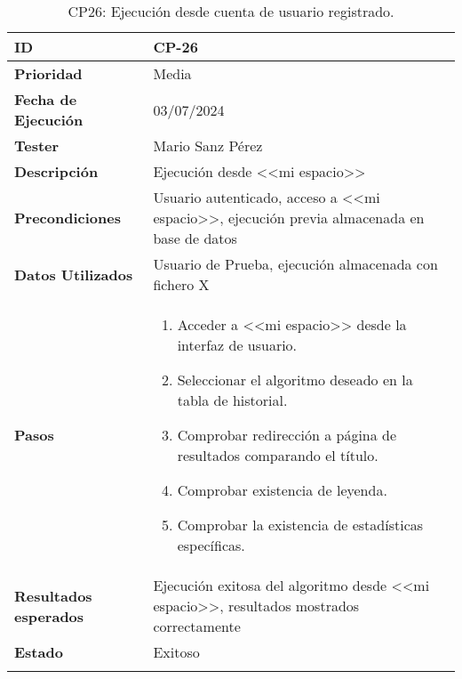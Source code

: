 \begin{longtable}{>{\raggedright\arraybackslash}p{4cm} p{9.5cm}}
    \hline
    \rowcolor{gray!20}
    \textbf{ID} & CP-26\\
    \hline
    \rowcolor{white}
    \textbf{Prioridad} & Media \\
    \hline
    \rowcolor{gray!20}
    \textbf{Fecha de Ejecución} & 03/07/2024 \\
    \hline
    \rowcolor{white}
    \textbf{Tester} & Mario Sanz Pérez \\
    \hline
    \rowcolor{gray!20}
    \textbf{Descripción} & Ejecución desde <<mi espacio>>\\
    \hline
    \rowcolor{white}
    \textbf{Precondiciones} & Usuario autenticado, acceso a <<mi espacio>>, ejecución previa almacenada en base de datos\\
    \hline
    \rowcolor{white}
    \textbf{Datos Utilizados} & Usuario de Prueba, ejecución almacenada con fichero X\\
    \hline
    \rowcolor{gray!20}
    \textbf{Pasos} & \begin{enumerate}
        \item Acceder a <<mi espacio>> desde la interfaz de usuario.
        \item Seleccionar el algoritmo deseado en la tabla de historial.
        \item Comprobar redirección a página de resultados comparando el título.
        \item Comprobar existencia de leyenda.
        \item Comprobar la existencia de estadísticas específicas.
    \end{enumerate}\\
	\hline
    \rowcolor{gray!20}
    \textbf{Resultados esperados} & Ejecución exitosa del algoritmo desde <<mi espacio>>, resultados mostrados correctamente\\
    \hline
    \rowcolor{white}
    \textbf{Estado} & Exitoso\\
    \hline
	\caption[CP26: Ejecución desde cuenta de usuario]{CP26: Ejecución desde cuenta de usuario registrado.}
\end{longtable}

